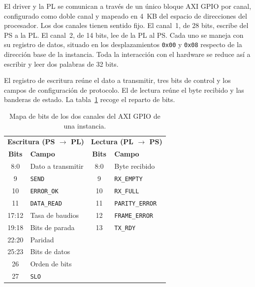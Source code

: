 El driver y la PL se comunican a través de un único bloque AXI GPIO por canal, configurado como
doble canal y mapeado en 4~KB del espacio de direcciones del procesador. Los dos canales tienen
sentido fijo. El canal~1, de 28 bits, escribe del PS a la PL. El canal~2, de 14 bits, lee de la PL
al PS. Cada uno se maneja con su registro de datos, situado en los desplazamientos \texttt{0x00} y
\texttt{0x08} respecto de la dirección base de la instancia. Toda la interacción con el hardware
se reduce así a escribir y leer dos palabras de 32 bits.

El registro de escritura reúne el dato a transmitir, tres bits de control y los campos de
configuración de protocolo. El de lectura reúne el byte recibido y las banderas de estado. La
tabla~\ref{tab:mapa_registros_gpio} recoge el reparto de bits.

\begin{table}[H]
    \centering
    \small
    \begin{tabular}{@{}c l c l@{}}
        \hline
        \multicolumn{2}{c}{\textbf{Escritura (PS $\rightarrow$ PL)}} &
        \multicolumn{2}{c}{\textbf{Lectura (PL $\rightarrow$ PS)}} \\
        \textbf{Bits} & \textbf{Campo} & \textbf{Bits} & \textbf{Campo} \\
        \hline
        8:0   & Dato a transmitir   & 8:0 & Byte recibido \\
        9     & \texttt{SEND}       & 9   & \texttt{RX\_EMPTY} \\
        10    & \texttt{ERROR\_OK}  & 10  & \texttt{RX\_FULL} \\
        11    & \texttt{DATA\_READ} & 11  & \texttt{PARITY\_ERROR} \\
        17:12 & Tasa de baudios     & 12  & \texttt{FRAME\_ERROR} \\
        19:18 & Bits de parada      & 13  & \texttt{TX\_RDY} \\
        22:20 & Paridad             &     & \\
        25:23 & Bits de datos       &     & \\
        26    & Orden de bits       &     & \\
        27    & \texttt{SLO}        &     & \\
        \hline
    \end{tabular}
    \caption{Mapa de bits de los dos canales del AXI GPIO de una instancia.}
    \label{tab:mapa_registros_gpio}
\end{table}

